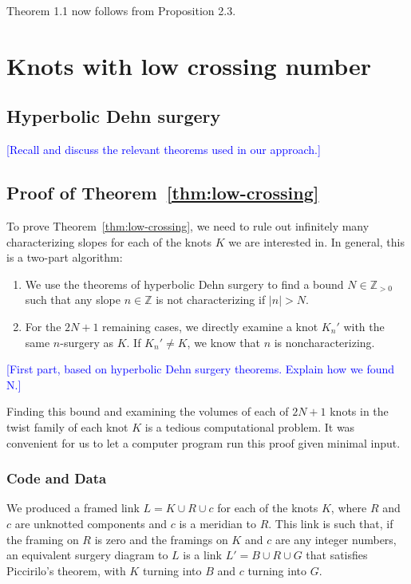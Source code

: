 \documentclass[11pt,usenames,dvipsnames,reqno]{amsart}
\newcommand{\zz}{\mathbb{Z}}
\numberwithin{theorem}{section}
\theoremstyle{ex}
\theoremstyle{rem}
\def\kh#1{\textcolor{Blue}{#1}}
\begin{document}
Theorem 1.1 now follows from Proposition 2.3.

\section{Knots with low crossing number}

\subsection{Hyperbolic Dehn surgery} \kh{[Recall and discuss the relevant theorems used in our approach.]}

\subsection{Proof of Theorem~\ref{thm:low-crossing}}

To prove Theorem~\ref{thm:low-crossing}, we need to rule out infinitely many characterizing slopes for each of the knots $K$ we are interested in. In general, this is a two-part algorithm:

\begin{enumerate}
	\item We use the theorems of hyperbolic Dehn surgery to find a bound $N \in \zz_{>0}$ such that any slope $n \in \zz$ is not characterizing if $|n|>N$.
	\item For the $2 N + 1$ remaining cases, we directly examine a knot $K_{n}'$ with the same $n$-surgery as $K$. If $K_{n}' \neq K$, we know that $n$ is noncharacterizing.
\end{enumerate}

\kh{[First part, based on hyperbolic Dehn surgery theorems. Explain how we found N.]}

Finding this bound and examining the volumes of each of $2 N + 1$ knots in the twist family of each knot $K$ is a tedious computational problem. It was convenient for us to let a computer program run this proof given minimal input.

\subsubsection{Code and Data}\label{sec:code}
We produced a framed link $L = K \cup R \cup c$ for each of the knots $K$, where $R$ and $c$ are unknotted components and $c$ is a meridian to $R$. This link is such that, if the framing on $R$ is zero and the framings on $K$ and $c$ are any integer numbers, an equivalent surgery diagram to $L$ is a link $L' = B \cup R \cup G$ that satisfies Piccirilo's theorem, with $K$ turning into $B$ and $c$ turning into $G$.
\end{document}
